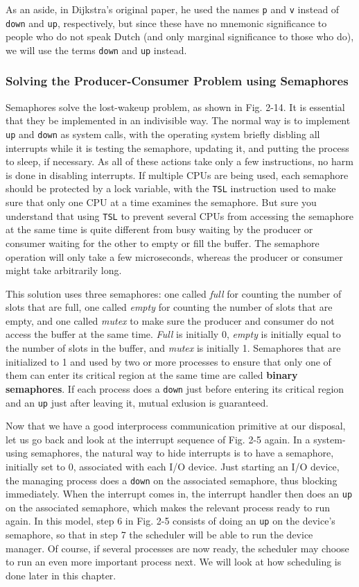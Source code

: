 \documentclass{book}
\newcommand {\kw}  [1] {\textbf{#1}}
\newcommand {\sys} [1] {\textsl{#1}}
\newcommand {\cmd} [1] {\texttt{#1}}
\begin{document}
As an aside, in Dijkstra's original paper, he used the names \cmd{p} and \cmd{v} instead of \cmd{down} and \cmd{up},
respectively, but since these have no mnemonic significance to people who do not speak Dutch (and only marginal significance to those who do),
we will use the terms \cmd{down} and \cmd{up} instead.

\subsubsection*{Solving the Producer-Consumer Problem using Semaphores}
Semaphores solve the lost-wakeup problem, as shown in Fig. 2-14.
It is essential that they be implemented in an indivisible way.
The normal way is to implement \cmd{up} and \cmd{down} as system calls,
with the operating system briefly disbling all interrupts while it is testing the semaphore,
updating it, and putting the process to sleep, if necessary.
As all of these actions take only a few instructions, no harm is done in disabling interrupts.
If multiple CPUs are being used, each semaphore should be protected by a lock variable, 
with the \cmd{TSL} instruction used to make sure that only one CPU at a time examines the semaphore.
But sure you understand that using \cmd{TSL} to prevent several CPUs from accessing the semaphore at the same time 
is quite different from busy waiting by the producer or consumer waiting for the other to empty or fill the buffer.
The semaphore operation will only take a few microseconds, whereas the producer or consumer might take arbitrarily long.

This solution uses three semaphores: 
one called \sys{full} for counting the number of slots that are full,
one called \sys{empty} for counting the number of slots that are empty,
and one called \sys{mutex} to make sure the producer and consumer do not access the buffer at the same time.
\sys{Full} is initially 0, \sys{empty} is initially equal to the number of slots in the buffer,
and \sys{mutex} is initially 1.
Semaphores that are initialized to 1 and used by two or more processes to ensure that 
only one of them can enter its critical region at the same time are called \kw{binary semaphores}.
If each process does a \cmd{down} just before entering its critical region and an \cmd{up} just after leaving it, mutual exlusion is guaranteed.

Now that we have a good interprocess communication primitive at our disposal, 
let us go back and look at the interrupt sequence of Fig. 2-5 again. 
In a system-using semaphores, the natural way to hide interrupts is to have a semaphore, 
initially set to 0, associated with each I/O device.
Just starting an I/O device, the managing process does a \cmd{down} on the associated semaphore, thus blocking immediately.
When the interrupt comes in, the interrupt handler then does an \cmd{up} on the associated semaphore,
which makes the relevant process ready to run again.
In this model, step 6 in Fig. 2-5 consists of doing an \cmd{up} on the device's semaphore,
so that in step 7 the scheduler will be able to run the device manager.
Of course, if several processes are now ready, the scheduler may choose to run an even more important process next.
We will look at how scheduling is done later in this chapter.
\end{document}
